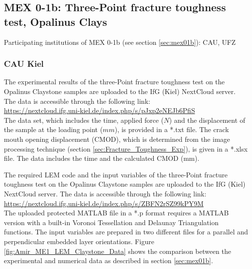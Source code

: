 \subsection{MEX 0-1b: Three-Point fracture toughness test, Opalinus Clays}

Participating institutions of MEX 0-1b (see section \ref{sec:mex01b}): CAU, UFZ

\subsubsection*{CAU Kiel}

The experimental results of the three-Point fracture toughness test on the Opalinus Claystone samples are uploaded to the IfG (Kiel) NextCloud server. The data is accessible through the following link:\\
\hyperlink{https://nextcloud.ifg.uni-kiel.de/index.php/s/pJxp2eNEJb6PfiS}{https://nextcloud.ifg.uni-kiel.de/index.php/s/pJxp2eNEJb6PfiS}\\

The data set, which includes the time, applied force ($N$) and the displacement of the sample at the loading point ($mm$), is provided in a *.txt file. The crack mouth opening displacement (CMOD), which is determined from the image processing technique (section \ref {sec:Fracture_Toughness_Exp}), is given in a *.xlsx file. The data includes the time and the calculated CMOD (mm). 

The required LEM code and the input variables of the three-Point fracture toughness test on the Opalinus Claystone samples are uploaded to the IfG (Kiel) NextCloud server. The data is accessible through the following link:\\
\hyperlink{https://nextcloud.ifg.uni-kiel.de/index.php/s/ZBFN2rSZ99kPY9M}{https://nextcloud.ifg.uni-kiel.de/index.php/s/ZBFN2rSZ99kPY9M}\\

The uploaded protected MATLAB file in a *.p format requires a MATLAB version with a built-in Voronoi Tessellation and Delaunay Triangulation functions. The input variables are prepared in two different files for a parallel and perpendicular embedded layer orientations. Figure \ref{fig:Amir_ME1_LEM_Claystone_Data} shows the comparison between the experimental and numerical data as described in section \ref {sec:mex01b}.

